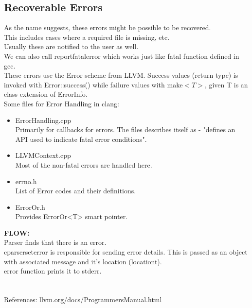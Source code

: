 \documentclass[12pt]{article}
\begin{document}
\subsection{Recoverable Errors}
As the name suggests, these errors might be possible to be recovered.\\
This includes cases where a required file is missing, etc.\\
Usually these are notified to the user as well.\\
We can also call report\textunderscore fatal\textunderscore error which works just like fatal function defined in gcc.\\
These errors use the Error scheme from LLVM.
Success values (return type) is invoked with Error::success() while failure values with make\textunderscore $<T>$, given T is an class extension of ErrorInfo.\\
Some files for Error Handling in clang:
\begin{itemize}
\item ErrorHandling.cpp\\
Primarily for callbacks for errors. The files describes itself as - "defines an API used to indicate fatal error conditions".
\item LLVMContext.cpp\\
Most of the non-fatal errors are handled here.
\item errno.h\\
List of Error codes and their definitions.
\item ErrorOr.h\\
Provides ErrorOr<T> smart pointer.
\end{itemize}
\textbf{FLOW:}\\
Parser finds that there is an error.\\
c\textunderscore parser\textunderscore set\textunderscore error is responsible for sending error details.
This is passed as an object with associated message and it's location (location\textunderscore t).\\
error function prints it to stderr.\\\\\\
References: llvm.org/docs/ProgrammersManual.html
\end{document}
